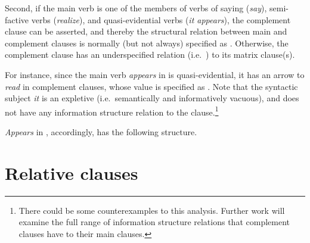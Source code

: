 Second, if the main verb is one of the members of verbs of saying
(\textit{say}), semi-factive verbs (\textit{realize}), and
quasi-evidential verbs (\textit{it appears}), the complement clause
can be asserted, and thereby the structural
relation between main and complement clauses is normally (but not
always) specified as .  Otherwise, the complement clause
has an underspecified relation (i.e.\ ) to its matrix
clause(s).



For instance, since the main verb \textit{appears} in
 is quasi-evidential, it has an arrow to
\textit{read} in complement clauses, whose value is specified as
. Note that the syntactic subject \textit{it} is an
expletive (i.e.\ semantically and informatively vacuous), and does not
have any information structure relation to the clause.\footnote{There
  could be some counterexamples to this analysis. Further work will
  examine the full range of information structure relations that
  complement clauses have to their main clauses.}


\noindent \textit{Appears} in , accordingly, has
the following structure.



\section{Relative clauses}
\label{10:ssec:relative}

